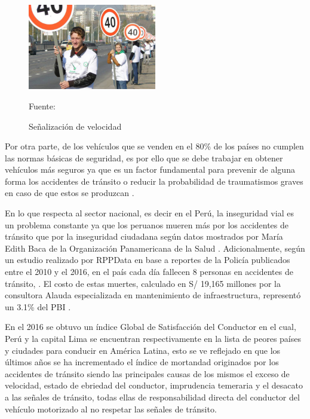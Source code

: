 	\vskip 0.15cm
	\begin{figure}[H]
	\begin{center}
	\includegraphics[width=0.5\textwidth]{images/intro/velocidad}
	\end{center}
	\begin{center}
	\caption{\small{Señalización de velocidad}}
	{\small{Fuente: \cite{OMS}}}
	\end{center}
	\vspace{-1.5em}
	\end{figure}
	
	Por otra parte, de los vehículos que se venden en el 80\% de los países no cumplen las normas básicas de seguridad, es por ello que se debe trabajar en obtener vehículos más seguros ya que es un factor fundamental para prevenir de alguna forma los accidentes de tránsito o reducir la probabilidad de traumatismos graves en caso de que estos se produzcan \citep{OMS}.
	
	\vskip 0.15cm
	En lo que respecta al sector nacional, es decir en el Perú, la inseguridad vial es un problema constante ya que los peruanos mueren más por los accidentes de tránsito que por la inseguridad ciudadana según datos mostrados por María Edith Baca de la Organización Panamericana de la Salud \citep{OPS}. Adicionalmente, según un estudio realizado por RPPData en base a reportes de la Policía publicados entre el 2010 y el 2016, en el país cada día fallecen 8 personas en accidentes de tránsito, \citep{RPPData}. El costo de estas muertes, calculado en S/ 19,165 millones por la consultora Alauda especializada en mantenimiento de infraestructura, representó un 3.1\% del PBI \citep{Gestion2}.  
	
	
	\vskip 0.15cm
	En el 2016 se obtuvo un índice Global de Satisfacción del Conductor \citep{CNN} en el cual, Perú y la capital Lima se encuentran respectivamente en la lista de peores países y ciudades para conducir en América Latina, esto se ve reflejado en que los últimos años se ha incrementado el índice de mortandad originados por los accidentes de tránsito siendo las principales causas de los mismos el exceso de velocidad, estado de ebriedad del conductor, imprudencia temeraria y el desacato a las señales de tránsito, todas ellas de responsabilidad directa del conductor del vehículo motorizado al no respetar las señales de tránsito\citep{SUTRAN}. 
	
